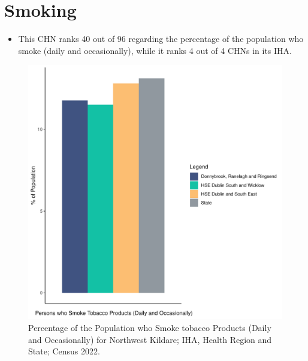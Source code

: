 \documentclass{article}
\begin{document}
\pagebreak

\section{Smoking}\label{sect:Smoking}
\begin{itemize}
\item This CHN ranks  40 out of 96 regarding the percentage of the population who smoke (daily and occasionally), while it ranks   4 out of 4 CHNs in its IHA.
\end{itemize}
\begin{figure}[H]
	\centering
	\includegraphics[width = 120mm]{../figures/SmokingED.pdf}
	\caption{Percentage of the Population who Smoke tobacco Products (Daily and Occasionally) for Northwest Kildare; IHA, Health Region and State; Census 2022.}
	\label{fig:2ae19629-1a6a-13a3-e055-000000000001}
	\end{figure}
	
\end{document}
